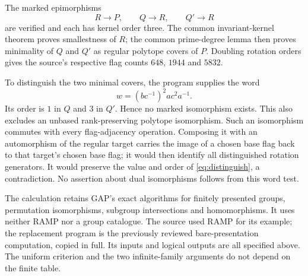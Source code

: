 The marked epimorphisms
\[
                         R\to P,\qquad Q\to R,
                         \qquad Q'\to R
\]
are verified and each has kernel order three. The common invariant-kernel theorem proves smallestness of $R$; the common prime-degree lemma then proves minimality of $Q$ and $Q'$ as regular polytope covers of $P$. Doubling rotation orders gives the source's respective flag counts $648$, $1944$ and $5832$.

To distinguish the two minimal covers, the program supplies the word
\begin{equation}\label{eq:distinguish}
                            w=(bc^{-1})^2ac^2a^{-1}.
\end{equation}
Its order is $1$ in $Q$ and $3$ in $Q'$. Hence no marked isomorphism exists. This also excludes an unbased rank-preserving polytope isomorphism. Such an isomorphism commutes with every flag-adjacency operation. Composing it with an automorphism of the regular target carries the image of a chosen base flag back to that target's chosen base flag; it would then identify all distinguished rotation generators. It would preserve the value and order of \eqref{eq:distinguish}, a contradiction. No assertion about dual isomorphisms follows from this word test.

The calculation retains GAP's exact algorithms for finitely presented groups, permutation isomorphisms, subgroup intersections and homomorphisms. It uses neither RAMP nor a group catalogue. The source used RAMP for its example; the replacement program is the previously reviewed bare-presentation computation, copied in full. Its inputs and logical outputs are all specified above. The uniform criterion and the two infinite-family arguments do not depend on the finite table.
